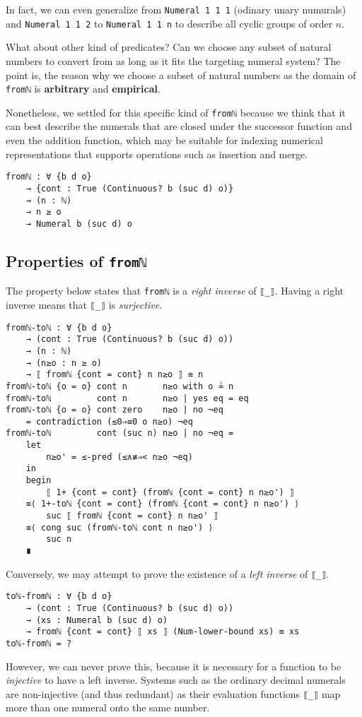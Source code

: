 \documentclass[\main/thesis.tex]{subfiles}
\begin{document}
In fact, we can even generalize from \lstinline|Numeral 1 1 1|
(odinary unary numurals) and \lstinline|Numeral 1 1 2| to \lstinline|Numeral 1 1 n|
to describe all cyclic groups of order $ n $.

What about other kind of predicates? Can we choose any subset of natural numbers
to convert from as long as it fits the targeting numeral system?
The point is, the reason why we choose a subset of natural numbers as the domain
of \lstinline|fromℕ| is \textbf{arbitrary} and \textbf{empirical}.

Nonetheless, we settled for this specific kind of \lstinline|fromℕ| because we
think that it can best describe the numerals that are closed under the successor
function and even the addition function, which may be suitable for indexing
numerical representations that supports operations such as insertion and merge.

\begin{lstlisting}
fromℕ : ∀ {b d o}
    → {cont : True (Continuous? b (suc d) o)}
    → (n : ℕ)
    → n ≥ o
    → Numeral b (suc d) o
\end{lstlisting}

\subsection{Properties of \lstinline|fromℕ|}

The property below states that \lstinline|fromℕ| is a \textit{right inverse} of
\lstinline|⟦_⟧|. Having a right inverse means that \lstinline|⟦_⟧| is
\textit{surjective}.

\begin{lstlisting}
fromℕ-toℕ : ∀ {b d o}
    → (cont : True (Continuous? b (suc d) o))
    → (n : ℕ)
    → (n≥o : n ≥ o)
    → ⟦ fromℕ {cont = cont} n n≥o ⟧ ≡ n
fromℕ-toℕ {o = o} cont n       n≥o with o ≟ n
fromℕ-toℕ         cont n       n≥o | yes eq = eq
fromℕ-toℕ {o = o} cont zero    n≥o | no ¬eq
    = contradiction (≤0⇒≡0 o n≥o) ¬eq
fromℕ-toℕ         cont (suc n) n≥o | no ¬eq =
    let
        n≥o' = ≤-pred (≤∧≢⇒< n≥o ¬eq)
    in
    begin
        ⟦ 1+ {cont = cont} (fromℕ {cont = cont} n n≥o') ⟧
    ≡⟨ 1+-toℕ {cont = cont} (fromℕ {cont = cont} n n≥o') ⟩
        suc ⟦ fromℕ {cont = cont} n n≥o' ⟧
    ≡⟨ cong suc (fromℕ-toℕ cont n n≥o') ⟩
        suc n
    ∎
\end{lstlisting}

Conversely, we may attempt to prove the existence of a \textit{left inverse}
of \lstinline|⟦_⟧|.

\begin{lstlisting}
toℕ-fromℕ : ∀ {b d o}
    → (cont : True (Continuous? b (suc d) o))
    → (xs : Numeral b (suc d) o)
    → fromℕ {cont = cont} ⟦ xs ⟧ (Num-lower-bound xs) ≡ xs
toℕ-fromℕ = ?
\end{lstlisting}

However, we can never prove this, because it is necessary for a function to be
\textit{injective} to have a left inverse.
Systems such as the ordinary decimal numerals are non-injective (and thus redundant)
as their evaluation functions \lstinline|⟦_⟧| map more than one numeral onto the
same number.
\end{document}
